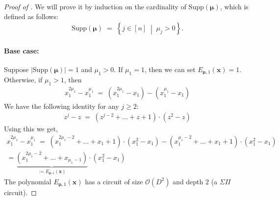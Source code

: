 \documentclass[11pt]{article}
\newcommand{\bigO}{\mathcal{O}}
\newcommand{\setcond}[2]{\left\{ #1 \;\middle\vert\; #2 \right\}}
\begin{document}
\monomialaxioms*

\begin{proof}[Proof of ]
 We will prove it by induction on the cardinality of $\mathrm{Supp}(\bm{\mu})$, which is defined as follows:
 \begin{align*}
     \mathrm{Supp}(\bm{\mu}) \; = \; \setcond{j \in [n]}{\mu_{j} > 0}.
 \end{align*}
 
\paragraph{Base case:}Suppose $|\mathrm{Supp}(\bm{\mu})| = 1$ and $\mu_{1} > 0$. If $\mu_{1} = 1$, then we can set $E_{\bm{\mu},1}(\mathbf{x}) = 1$. Otherwise, if $\mu_{1} > 1$, then
\begin{align*}
    x_{1}^{2 \mu_{1}} - x_{1}^{\mu_{1}} \; = \; (x_{1}^{2 \mu_{1}} - x_{1}) - (x_{1}^{\mu_{1}} - x_{1})    
\end{align*}
We have the following identity for any $j \geq 2$:
\begin{align*}
    z^{j} - z \; = \; (z^{j-2} + \ldots + z + 1) \cdot (z^{2} - z)
\end{align*}
Using this we get,
\begin{gather*}
     x_{1}^{2 \mu_{1}} - x_{1}^{\mu_{1}} \; = \; (x_{1}^{2 \mu_{1} - 2} + \ldots + x_{1} + 1) \cdot (x_{1}^{2} - x_{1}) - (x_{1}^{\mu_{1} - 2} + \ldots + x_{1} + 1) \cdot (x_{1}^{2} - x_{1}) \\
     = \underbrace{(x_{1}^{2 \mu_{1} - 2} + \ldots + x_{\mu_{1} - 1})}_{:= E_{\bm{\mu},1}(\mathbf{x})} \cdot (x_{1}^{2} - x_{1})
\end{gather*}
The polynomial $E_{\bm{\mu},1}(\mathbf{x})$ has a circuit of size $\bigO(D^{2})$ and depth $2$ (a $\Sigma \Pi$ circuit).


\end{proof}
\end{document}
